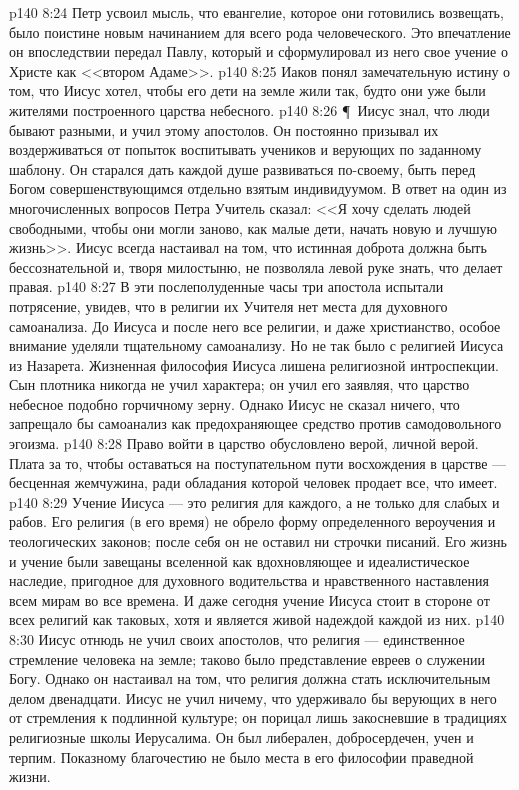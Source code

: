 \vs p140 8:24 Петр усвоил мысль, что евангелие, которое они готовились возвещать, было поистине новым начинанием для всего рода человеческого. Это впечатление он впоследствии передал Павлу, который и сформулировал из него свое учение о Христе как <<втором Адаме>>.
\vs p140 8:25 Иаков понял замечательную истину о том, что Иисус хотел, чтобы его дети на земле жили так, будто они уже были жителями построенного царства небесного.
\vs p140 8:26 \P\ Иисус знал, что люди бывают разными, и учил этому апостолов. Он постоянно призывал их воздерживаться от попыток воспитывать учеников и верующих по заданному шаблону. Он старался дать каждой душе развиваться по\hyp{}своему, быть перед Богом совершенствующимся отдельно взятым индивидуумом. В ответ на один из многочисленных вопросов Петра Учитель сказал: <<Я хочу сделать людей свободными, чтобы они могли заново, как малые дети, начать новую и лучшую жизнь>>. Иисус всегда настаивал на том, что истинная доброта должна быть бессознательной и, творя милостыню, не позволяла левой руке знать, что делает правая.
\vs p140 8:27 В эти послеполуденные часы три апостола испытали потрясение, увидев, что в религии их Учителя нет места для духовного самоанализа. До Иисуса и после него все религии, и даже христианство, особое внимание уделяли тщательному самоанализу. Но не так было с религией Иисуса из Назарета. Жизненная философия Иисуса лишена религиозной интроспекции. Сын плотника никогда не учил  характера; он учил его  заявляя, что царство небесное подобно горчичному зерну. Однако Иисус не сказал ничего, что запрещало бы самоанализ как предохраняющее средство против самодовольного эгоизма.
\vs p140 8:28 Право войти в царство обусловлено верой, личной верой. Плата за то, чтобы оставаться на поступательном пути восхождения в царстве --- бесценная жемчужина, ради обладания которой человек продает все, что имеет.
\vs p140 8:29 Учение Иисуса --- это религия для каждого, а не только для слабых и рабов. Его религия (в его время) не обрело форму определенного вероучения и теологических законов; после себя он не оставил ни строчки писаний. Его жизнь и учение были завещаны вселенной как вдохновляющее и идеалистическое наследие, пригодное для духовного водительства и нравственного наставления всем мирам во все времена. И даже сегодня учение Иисуса стоит в стороне от всех религий как таковых, хотя и является живой надеждой каждой из них.
\vs p140 8:30 Иисус отнюдь не учил своих апостолов, что религия --- единственное стремление человека на земле; таково было представление евреев о служении Богу. Однако он настаивал на том, что религия должна стать исключительным делом двенадцати. Иисус не учил ничему, что удерживало бы верующих в него от стремления к подлинной культуре; он порицал лишь закосневшие в традициях религиозные школы Иерусалима. Он был либерален, добросердечен, учен и терпим. Показному благочестию не было места в его философии праведной жизни.
